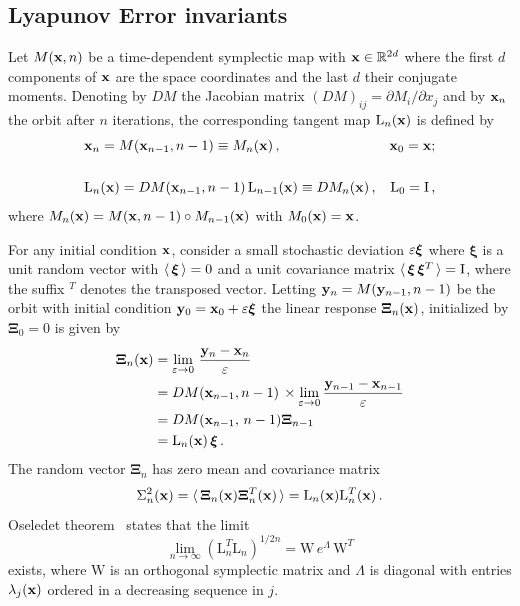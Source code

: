 \subsection{Lyapunov Error invariants\label{subsec:le}}
%
Let $M(\vb{x},n)$ be a time-dependent symplectic map with $\vb{x}\in \mathbb{R}^{2d}$ where the first $d$ components of $\vb{x}$ are the space coordinates and the last $d$  their conjugate moments. Denoting by $DM$ the Jacobian matrix $(DM)_{ij}=\partial M_i/\partial x_j$ and by $\vb{x}_n$ the orbit after $n$ iterations, the corresponding tangent map $\mathrm{L}_n(\vb{x})$ is defined by 
%
\begin{equation}
  \begin{aligned}
  &\vb{x}_n =M(\vb{x}_{n-1},n-1) \equiv M_n(\vb{x}) \,,   &\vb{x}_0=\vb{x};& \\ \\
  &\mathrm{L}_n(\vb{x}) = DM(\vb{x}_{n-1}, n-1) \,\mathrm{L}_{n-1}(\vb{x})  \equiv DM_n(\vb{x}) \,,     &\mathrm{L}_0=\mathrm{I} \, , &
  \end{aligned}
  \label{eq2-1}
\end{equation}
%
where $M_n(\vb{x})= M(\vb{x},n-1)\circ M_{n-1}(\vb{x})$ with $M_0(\vb{x})=\vb{x}$.

For any initial condition $\vb{x}$, consider a small stochastic deviation $\varepsilon\boldsymbol{\xi}$ where
$\boldsymbol{\xi}$ is a unit random vector with $\langle \,\boldsymbol{\xi}\,\rangle=0$ and a unit covariance matrix $\langle \,\boldsymbol{\xi}\,\boldsymbol{\xi}^T\,\rangle=\mathrm{I} $, where the suffix $^T$ denotes the transposed vector. Letting $\vb{y}_n=M(\vb{y}_{n-1},n-1)$ be the orbit with initial condition $\vb{y}_0=\vb{x}_0+\varepsilon\boldsymbol{\xi}$ the linear response $\boldsymbol{\Xi}_n(\vb{x})$, initialized by $\boldsymbol{\Xi}_0=0$ is given by 
%
\begin{equation}
  \begin{split}
    \boldsymbol{\Xi}_n (\vb{x}) &= \lim_{\varepsilon \to 0}\,\frac{\vb{y}_n-\vb{x}_n}{ \varepsilon} \\
     &= DM(\vb{x}_{n-1},n-1)\,  \times   \lim_{\varepsilon \to 0} \frac{\vb{y}_{n-1}-\vb{x}_{n-1}}{ \varepsilon} \\
     &= DM(\vb{x}_{n-1},\,n-1)  \boldsymbol{\Xi}_{n-1} \\
     &= \mathrm{L}_n(\vb{x})\,\boldsymbol{\xi} \,.
  \end{split}
  \label{eq2-2}
\end{equation}
%
The random vector $\boldsymbol{\Xi}_n$ has zero mean and covariance matrix
%
\begin{equation}
    \Sigma^2_n(\vb{x})= \langle \,\boldsymbol{\Xi}_n(\vb{x})\boldsymbol{\Xi}_n^T(\vb{x})\,\rangle= \mathrm{L}_n(\vb{x})\mathrm{L}_n^T(\vb{x}) \,.
    \label{eq2-3}
\end{equation}
%
Oseledet theorem~\cite{Oseledets1961} states that the limit
\begin{equation}
    \lim_{n\to\infty}(\mathrm{L}_n^T\mathrm{L}_n)^{1/2n}= \mathrm{W}\,e^{\Lambda}\,\mathrm{W}^T 
\end{equation}
exists, where $\mathrm{W}$ is an orthogonal symplectic matrix and $\Lambda$ is diagonal with entries $\lambda_j(\vb{x})$ ordered in a decreasing sequence in $j$.

